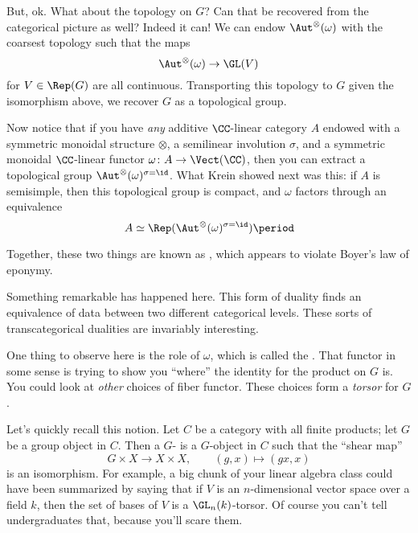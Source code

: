 \documentclass[leqno]{article}
\begin{document}
But, ok. What about the topology on \(G\)?
Can that be recovered from the categorical picture as well?
Indeed it can!
We can endow \(\Aut^{\otimes}(\omega)\) with
the coarsest topology such that the maps
\begin{equation*}
    \Aut^{\otimes }(\omega) \to \GL(V)
\end{equation*}
for \(V \in \Rep(G)\) are all continuous.
Transporting this topology to \(G\) given the isomorphism above,
we recover \(G\) as a topological group.

Now notice that
if you have \emph{any} additive \(\CC\)-linear category \(A\)
endowed with a symmetric monoidal structure \(\otimes\),
a semilinear involution \(\sigma\),
and a symmetric monoidal
\(\CC\)-linear functor \(\omega \colon A \to \Vect(\CC)\),
then you can extract a topological group
\(\Aut^{\otimes}(\omega)^{\sigma=\id}\).
What Krein showed next was this:
if \(A\) is semisimple, then this topological group is compact,
and \(\omega\) factors through an equivalence
\begin{equation*}
    A \simeq \Rep(\Aut^{\otimes}(\omega)^{\sigma=\id}) \period
\end{equation*}

Together, these two things are known as
,
which appears to violate Boyer's law of eponymy.

Something remarkable has happened here.
This form of duality finds an equivalence of data between
two different categorical levels.
These sorts of transcategorical dualities are invariably interesting.

One thing to observe here is the role of \(\omega\),
which is called the .
That functor in some sense is trying to show you \enquote{where}
the identity for the product on \(G\) is.
You could look at \emph{other} choices of fiber functor.
These choices form
a \emph{torsor} for \(G\).

Let's quickly recall this notion.
Let \(C\) be a category with all finite products;
let \(G\) be a group object in \(C\).
Then a \(G\)- is a \(G\)-object in \(C\)
such that the \enquote{shear map}
\begin{equation*}
    G \times X \to X \times X \comma \qquad
    (g,x) \mapsto (gx, x)
\end{equation*}
is an isomorphism.
For example, a big chunk of your linear algebra class
could have been summarized by saying that
if \(V\) is an \(n\)-dimensional vector space over a field \(k\),
then the set of bases of \(V\) is a \(\GL_n(k)\)-torsor.
Of course you can't tell undergraduates that,
because you'll scare them.
\end{document}
